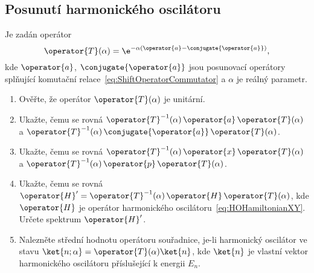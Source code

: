 \subsection{Posunutí harmonického oscilátoru}
Je zadán operátor
\begin{equation}
    \operator{T}(\alpha)
        =\e^{-\alpha\left(\operator{a}-\conjugate{\operator{a}}\right)},
\end{equation}
kde $\operator{a}$, $\conjugate{\operator{a}}$ jsou posunovací operátory splňující komutační relace~\eqref{eq:ShiftOperatorCommutator} a $\alpha$ je reálný parametr.

\begin{enumerate}
\item
    Ověřte, že operátor $\operator{T}(\alpha)$ je unitární.
    
\item
    Ukažte, čemu se rovná $\operator{T}^{-1}(\alpha)\,\operator{a}\,\operator{T}(\alpha)$ a $\operator{T}^{-1}(\alpha)\,\conjugate{\operator{a}}\,\operator{T}(\alpha)$.
            
\item
    Ukažte, čemu se rovná $\operator{T}^{-1}(\alpha)\,\operator{x}\,\operator{T}(\alpha)$ a $\operator{T}^{-1}(\alpha)\,\operator{p}\,\operator{T}(\alpha)$.
    
\item
    Ukažte, čemu se rovná $\operator{H}'=\operator{T}^{-1}(\alpha)\,\operator{H}\,\operator{T}(\alpha)$, kde $\operator{H}$ je operátor harmonického oscilátoru~\eqref{eq:HOHamiltonianXY}.
    Určete spektrum $\operator{H}'$.

\item
    Nalezněte střední hodnotu operátoru souřadnice, je-li harmonický oscilátor ve stavu $\ket{n;\alpha}=\operator{T}(\alpha)\ket{n}$, kde $\ket{n}$ je vlastní vektor harmonického oscilátoru příslušející k energii $E_{n}$.            
\end{enumerate}
	
